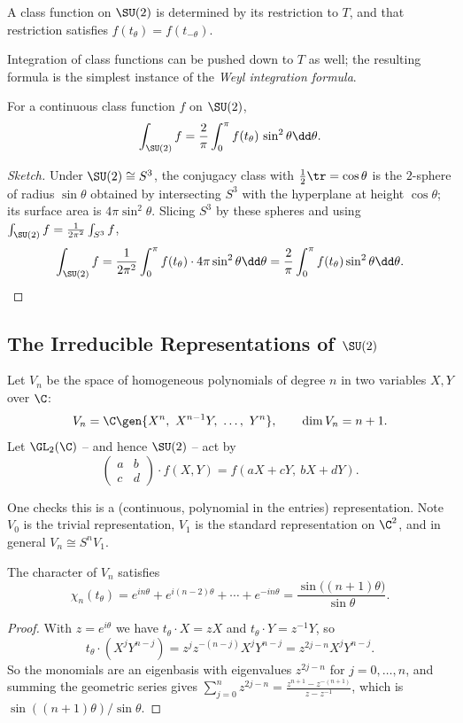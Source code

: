 \begin{corollary}
	A class function on $\SU(2)$ is determined by its restriction to $T$, and that restriction satisfies $f(t_\theta) = f(t_{-\theta})$.
\end{corollary}

Integration of class functions can be pushed down to $T$ as well; the resulting formula is the simplest instance of the \emph{Weyl integration formula}.

\begin{proposition}
	For a continuous class function $f$ on $\SU(2)$,
	$$\int_{\SU(2)}f = \frac2\pi\int_0^\pi f(t_\theta)\,\sin^2\theta\dd\theta.$$
\end{proposition}
\begin{proof}[Sketch]
	Under $\SU(2)\cong S^3$, the conjugacy class with $\frac12\tr = \cos\theta$ is the $2$-sphere of radius $\sin\theta$ obtained by intersecting $S^3$ with the hyperplane at height $\cos\theta$; its surface area is $4\pi\sin^2\theta$. Slicing $S^3$ by these spheres and using $\int_{\SU(2)}f = \frac1{2\pi^2}\int_{S^3}f$,
	$$\int_{\SU(2)}f = \frac1{2\pi^2}\int_0^\pi f(t_\theta)\cdot4\pi\sin^2\theta\dd\theta = \frac2\pi\int_0^\pi f(t_\theta)\sin^2\theta\dd\theta. \qedhere$$
\end{proof}

\subsection{The Irreducible Representations of \texorpdfstring{$\SU(2)$}{SU(2)}}

\begin{definition}
	Let $V_n$ be the space of homogeneous polynomials of degree $n$ in two variables $X, Y$ over $\C$:
	$$V_n = \C\gen{X^n,\ X^{n-1}Y,\ \dots,\ Y^n}, \qquad \dim V_n = n+1.$$
	Let $\GL_2(\C)$ -- and hence $\SU(2)$ -- act by
	$$\begin{pmatrix}a&b\\c&d\end{pmatrix}\cdot f(X,Y) = f(aX+cY,\ bX+dY).$$
\end{definition}

One checks this is a (continuous, polynomial in the entries) representation. Note $V_0$ is the trivial representation, $V_1$ is the standard representation on $\C^2$, and in general $V_n\cong S^nV_1$.

\begin{proposition}
	The character of $V_n$ satisfies
	$$\chi_n(t_\theta) = e^{in\theta}+e^{i(n-2)\theta}+\cdots+e^{-in\theta} = \frac{\sin\big((n+1)\theta\big)}{\sin\theta}.$$
\end{proposition}
\begin{proof}
	With $z = e^{i\theta}$ we have $t_\theta\cdot X = zX$ and $t_\theta\cdot Y = z^{-1}Y$, so
	$$t_\theta\cdot(X^jY^{n-j}) = z^{j}z^{-(n-j)}X^jY^{n-j} = z^{2j-n}X^jY^{n-j}.$$
	So the monomials are an eigenbasis with eigenvalues $z^{2j-n}$ for $j = 0,\dots,n$, and summing the geometric series gives $\sum_{j=0}^nz^{2j-n} = \frac{z^{n+1}-z^{-(n+1)}}{z-z^{-1}}$, which is $\sin((n+1)\theta)/\sin\theta$.
\end{proof}

